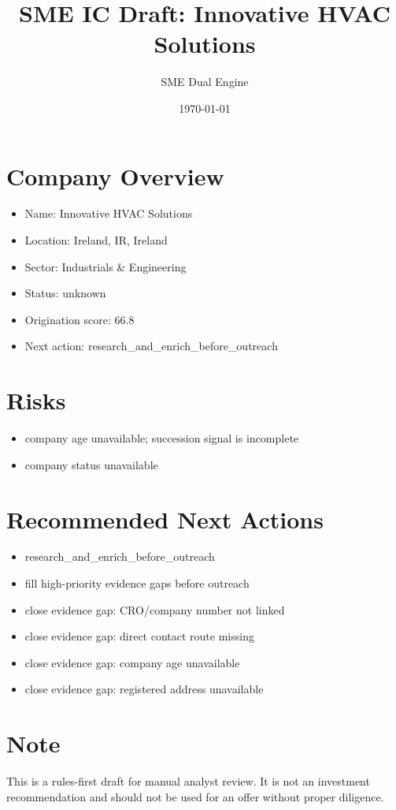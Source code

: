 \documentclass[11pt,a4paper]{article}
\title{SME IC Draft: Innovative HVAC Solutions}
\author{SME Dual Engine}
\date{\today}
\begin{document}
\maketitle
\section*{Company Overview}
\begin{itemize}[leftmargin=1.4em]
\item Name: Innovative HVAC Solutions
\item Location: Ireland, IR, Ireland
\item Sector: Industrials \& Engineering
\item Status: unknown
\item Origination score: 66.8
\item Next action: research\_and\_enrich\_before\_outreach
\end{itemize}
\section*{Risks}
\begin{itemize}[leftmargin=1.4em]
\item company age unavailable; succession signal is incomplete
\item company status unavailable
\end{itemize}
\section*{Recommended Next Actions}
\begin{itemize}[leftmargin=1.4em]
\item research\_and\_enrich\_before\_outreach
\item fill high-priority evidence gaps before outreach
\item close evidence gap: CRO/company number not linked
\item close evidence gap: direct contact route missing
\item close evidence gap: company age unavailable
\item close evidence gap: registered address unavailable
\end{itemize}
\section*{Note}
This is a rules-first draft for manual analyst review. It is not an investment
recommendation and should not be used for an offer without proper diligence.
\end{document}

